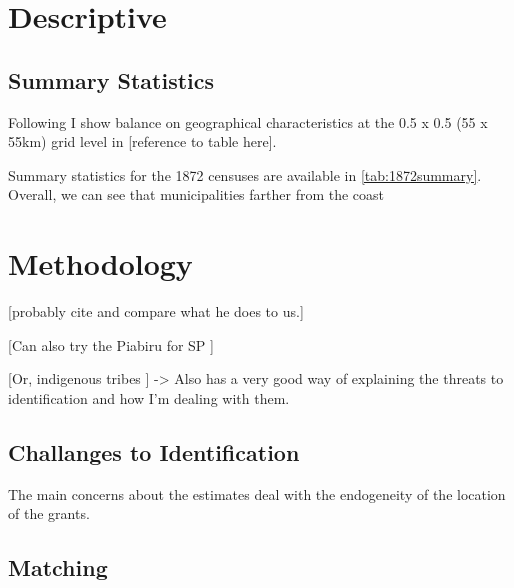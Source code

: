 \documentclass{article}
\begin{document}
\section{Descriptive}

\subsection{Summary Statistics}

Following \textcite{Lowes2021-ww} I show balance on geographical characteristics at the 0.5 x 0.5 (55 x 55km) grid level in [reference to table here].

Summary statistics for the 1872 censuses are available in \autoref{tab:1872summary}. Overall, we can see that municipalities farther from the coast 

\section{Methodology}

[probably cite \parencite{Rocha2017-yq} and compare what he does to us.]

[Can also try the Piabiru for SP \parencite{Barsanetti2021-hp}]

[Or, indigenous tribes \parencite{Barsanetti2023-xq}] -> Also has a very good way of explaining the threats to identification and how I'm dealing with them.

\subsection{Challanges to Identification}

The main concerns about the estimates deal with the endogeneity of the location of the grants. 



\subsection{Matching}
\end{document}

